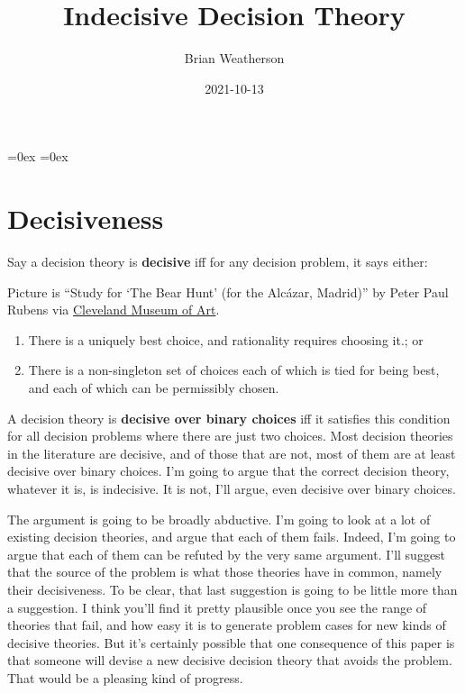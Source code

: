 \documentclass[
  12pt,
]{article}
\title{Indecisive Decision Theory}
\author{Brian Weatherson}
\date{2021-10-13}
\providecommand{\tightlist}{%
  \setlength{\itemsep}{0pt}\setlength{\parskip}{0pt}}
\begin{document}
\maketitle

\setlength\heavyrulewidth{0ex}
\setlength\lightrulewidth{0.08ex}

\aboverulesep=0ex
\belowrulesep=0ex
\renewcommand{\arraystretch}{1.2}
\hypersetup{hidelinks}

\renewcommand\refname{References}

\captionsetup{labelformat=empty, font = small, font = bf, position = below}

\hypertarget{decisiveness}{%
\section{Decisiveness}\label{decisiveness}}

Say a decision theory is \textbf{decisive} iff for any decision problem,
it says either:

Picture is ``Study for `The Bear Hunt' (for the Alcázar, Madrid)'' by
Peter Paul Rubens via
\href{https://www.clevelandart.org/art/1983.69}{Cleveland Museum of
Art}.

\begin{enumerate}
\def\labelenumi{\arabic{enumi}.}
\tightlist
\item
  There is a uniquely best choice, and rationality requires choosing
  it.; or
\item
  There is a non-singleton set of choices each of which is tied for
  being best, and each of which can be permissibly chosen.
\end{enumerate}

A decision theory is \textbf{decisive over binary choices} iff it
satisfies this condition for all decision problems where there are just
two choices. Most decision theories in the literature are decisive, and
of those that are not, most of them are at least decisive over binary
choices. I'm going to argue that the correct decision theory, whatever
it is, is indecisive. It is not, I'll argue, even decisive over binary
choices.

The argument is going to be broadly abductive. I'm going to look at a
lot of existing decision theories, and argue that each of them fails.
Indeed, I'm going to argue that each of them can be refuted by the very
same argument. I'll suggest that the source of the problem is what those
theories have in common, namely their decisiveness. To be clear, that
last suggestion is going to be little more than a suggestion. I think
you'll find it pretty plausible once you see the range of theories that
fail, and how easy it is to generate problem cases for new kinds of
decisive theories. But it's certainly possible that one consequence of
this paper is that someone will devise a new decisive decision theory
that avoids the problem. That would be a pleasing kind of progress.
\end{document}
